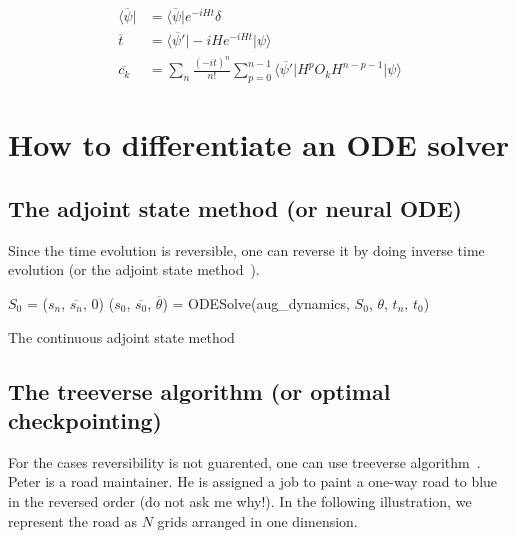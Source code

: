 \documentclass{article}
\theoremstyle{definition}
\begin{document}
\begin{align}
    \overline{\langle\psi|} &= \overline{\langle\psi|}e^{-iHt}\delta\\
    \overline{t} &= \overline{\langle\psi'|}-iHe^{-iHt}|\psi\rangle\\
    \overline{c_k} &= \sum_n \frac{(-it)^n}{n!}\sum_{p=0}^{n-1} \overline{\langle\psi'|}H^p O_k H^{n-p-1}|\psi\rangle
\end{align}

\section{How to differentiate an ODE solver}
\subsection{The adjoint state method (or neural ODE)}
Since the time evolution is reversible, one can reverse it by doing inverse time evolution (or the adjoint state method~\cite{Plessix2006,Chen2018}).

\begin{algorithm}
    \SetAlgoLined
    \DontPrintSemicolon
        $S_0$ = ($s_n$, $\overline{s_n}$, $0$) 
        ($s_0$, $\overline{s_0}$, $\overline{\theta}$) = ODESolve(aug\_dynamics, $S_0$, $\theta$, $t_n$, $t_0$) 
    \caption{The continuous adjoint state method}\label{alg:adjointstate}
\end{algorithm}


\subsection{The treeverse algorithm (or optimal checkpointing)}

For the cases reversibility is not guarented, one can use treeverse algorithm~\cite{Griewank1992,TreeverseAlgorithm}.
Peter is a road maintainer.
He is assigned a job to paint a one-way road to blue in the reversed order (do not ask me why!).
In the following illustration, we represent the road as $N$ grids arranged in one dimension.
\end{document}
